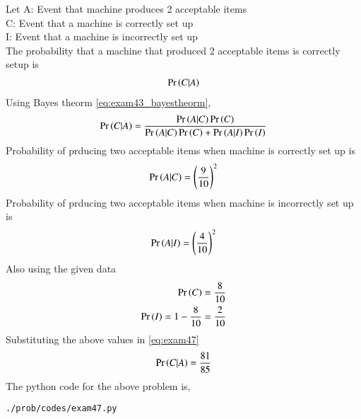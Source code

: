 Let 
A: Event that machine produces 2 acceptable items
\\
C: Event that a machine is correctly set up
\\
I: Event that a machine is incorrectly set up
\\
The probability that a machine that produced 2 acceptable items is correctly setup is
\begin{align}
\Pr\left(C|A\right)
\end{align}
Using Bayes theorm \eqref{eq:exam43_bayestheorm},
\begin{align}
\Pr\left(C|A\right)= \frac{\Pr\left(A|C\right)\Pr\left(C\right)}{\Pr\left(A|C\right)\Pr\left(C\right)+\Pr\left(A|I\right)\Pr\left(I\right)}
\label{eq:exam47}
\end{align}
Probability of prducing two acceptable items when machine is correctly set up is
\begin{align}
\Pr\left(A|C\right)={\left(\frac{9}{10}\right)}^{2}
\end{align}
Probability of prducing two acceptable items when machine is incorrectly set up is
\begin{align}
\Pr\left(A|I\right)={\left(\frac{4}{10}\right)}^{2}
\end{align}
Also using the given data
\begin{align}
\Pr\left(C\right)=\frac{8}{10}
\\
\Pr\left(I\right)=1-\frac{8}{10}=\frac{2}{10}
\end{align}
Substituting the above values in \eqref{eq:exam47}
\begin{align}
\Pr\left(C|A\right)= \frac{81}{85}
\end{align}
The python code for the above problem is,
\begin{lstlisting}
./prob/codes/exam47.py
\end{lstlisting}
